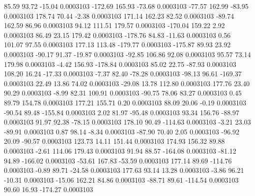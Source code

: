        85.59       93.72      -15.04     0.0003103
     -172.69      165.93      -73.68     0.0003103
      -77.57      162.99      -83.95     0.0003103
      178.74       70.44       -2.38     0.0003103
      171.14      162.23       82.52     0.0003103
      -89.74      162.59       86.96     0.0003103
       94.12      111.51      179.57     0.0003103
     -170.04      159.22        2.92     0.0003103
       86.49       23.15      179.42     0.0003103
     -178.76       84.83      -11.63     0.0003103
        0.56      101.07       97.55     0.0003103
      177.13      113.48     -179.77     0.0003103
     -175.87       89.93       23.92     0.0003103
      -90.17       91.37      -19.87     0.0003103
      -92.85      106.86       92.08     0.0003103
       95.57       73.14      179.98     0.0003103
       -4.42      156.93     -178.84     0.0003103
       85.02       22.75      -87.93     0.0003103
      108.20       16.24      -17.33     0.0003103
       -7.37       82.40      -78.28     0.0003103
      -98.13       96.61     -169.37     0.0003103
       22.49       13.86       74.02     0.0003103
      -29.08       13.78      112.80     0.0003103
      177.76       23.40       90.29     0.0003103
       -8.99       82.31      100.91     0.0003103
      -90.75       78.06       83.27     0.0003103
        0.45       89.79      154.78     0.0003103
      177.21      155.71        0.20     0.0003103
       88.09       20.06       -0.19     0.0003103
      -90.54       89.48     -155.84     0.0003103
        2.02       81.97      -95.48     0.0003103
       93.34      156.76      -88.97     0.0003103
       91.97       92.38      -78.15     0.0003103
      178.10       90.49     -114.63     0.0003103
       -3.21       23.03      -89.91     0.0003103
        0.87       98.14       -8.34     0.0003103
      -87.90       70.40        2.05     0.0003103
      -96.92       20.09      -90.57     0.0003103
      123.73       14.11      151.44     0.0003103
      174.93      156.32       89.88     0.0003103
       -2.61      114.06      179.43     0.0003103
       91.94       88.57     -164.08     0.0003103
      -81.12       94.89     -166.02     0.0003103
      -53.61      167.83      -53.59     0.0003103
      177.14       89.69     -114.76     0.0003103
       -0.89       89.71      -24.58     0.0003103
      177.63       93.14       13.28     0.0003103
       -3.86       96.21      -10.31     0.0003103
      -15.06      162.21       84.86     0.0003103
      -88.71       89.61     -114.54     0.0003103
       90.60       16.93     -174.27     0.0003103

